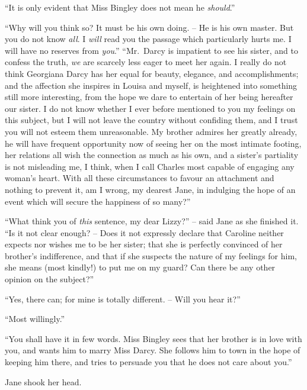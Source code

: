 “It is only evident that Miss Bingley does not mean
he \textit{should}.”

“Why will you think so? It must be his own doing. -- He
is his own master. But you do not know \textit{all}. I \textit{will}
read you the passage which particularly hurts me. I will
have no reserves from \textit{you}.” “Mr.\ Darcy is impatient
to see his sister, and to confess the truth, \textit{we} are
scarcely less eager to meet her again. I really do
not think Georgiana Darcy has her equal for beauty,
elegance, and accomplishments; and the affection she
inspires in Louisa and myself, is heightened into something
still more interesting, from the hope we dare to
entertain of her being hereafter our sister. I do not
know whether I ever before mentioned to you my
feelings on this subject, but I will not leave the country
without confiding them, and I trust you will not esteem
them unreasonable. My brother admires her greatly
already, he will have frequent opportunity now of seeing
her on the most intimate footing, her relations all wish
the connection as much as his own, and a sister’s partiality
is not misleading me, I think, when I call Charles most
capable of engaging any woman’s heart. With all these
circumstances to favour an attachment and nothing to prevent
it, am I wrong, my dearest Jane, in indulging the hope
of an event which will secure the happiness of so many?”

“What think you of \textit{this} sentence, my dear Lizzy?” -- said
Jane as she finished it. “Is it not clear enough? -- Does
it not expressly declare that Caroline neither expects
nor wishes me to be her sister; that she is perfectly convinced
of her brother’s indifference, and that if she suspects
the nature of my feelings for him, she means (most kindly!)
to put me on my guard? Can there be any other opinion
on the subject?”

“Yes, there can; for mine is totally different. -- Will
you hear it?”

“Most willingly.”

“You shall have it in few words. Miss Bingley sees
that her brother is in love with you, and wants him to
marry Miss Darcy. She follows him to town in the hope
of keeping him there, and tries to persuade you that he
does not care about you.”

Jane shook her head.


